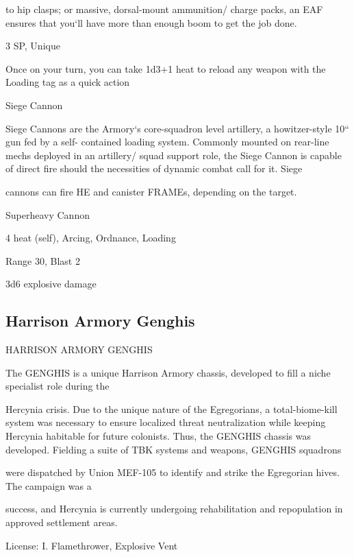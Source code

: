 to hip clasps; or massive, dorsal-mount ammunition/ charge packs, an EAF ensures that you‘ll have more  
than enough boom to get the job done.   

3 SP, Unique
 
Once on your turn, you can take 1d3+1 heat to reload any weapon with the Loading tag as a  
quick action
 

Siege Cannon  

Siege Cannons are the Armory‘s core-squadron level artillery, a howitzer-style 10“ gun fed by a self- 
contained loading system. Commonly mounted on rear-line mechs deployed in an artillery/ squad support  
role, the Siege Cannon is capable of direct fire should the necessities of dynamic combat call for it. Siege  

cannons can fire HE and canister FRAMEs, depending on the target.   

Superheavy Cannon
 
4 heat (self), Arcing, Ordnance, Loading
 
Range 30, Blast 2
 
3d6 explosive damage
 

                                                                                                                

\subsection{Harrison Armory Genghis}
                                                              
                                  HARRISON ARMORY GENGHIS  

The GENGHIS is a unique Harrison Armory chassis, developed to fill a niche specialist role during the  

Hercynia crisis. Due to the unique nature of the Egregorians, a total-biome-kill system was necessary to  
ensure localized threat neutralization while keeping Hercynia habitable for future colonists. Thus, the  
GENGHIS chassis was developed. Fielding a suite of TBK systems and weapons, GENGHIS squadrons  

were dispatched by Union MEF-105 to identify and strike the Egregorian hives. The campaign was a  

success, and Hercynia is currently undergoing rehabilitation and repopulation in approved settlement areas.    

                                                       License:   
I. Flamethrower, Explosive Vent
 
